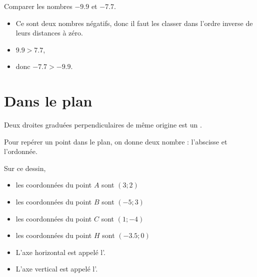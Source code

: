 \begin{example}
    Comparer les nombres \( -9.9\) et \( -7.7\).
    \begin{itemize}
        \item Ce sont deux nombres négatifs, donc il faut les classer dans l'ordre inverse de leurs distances à zéro.
        \item \( 9.9 > 7.7\),
        \item donc \( -7.7 > -9.9\).
    \end{itemize}
\end{example}

\section{Dans le plan}



\begin{definition}
    Deux droites graduées perpendiculaires de même origine est un . 
\end{definition}

\begin{Aretenir}
    Pour repérer un point dans le plan, on donne deux nombre : l'abscisse et l'ordonnée.
\end{Aretenir}

\begin{example}
    \begin{center}
        
    \end{center}
    Sur ce dessin,
    \begin{itemize}
        \item les coordonnées du point \( A\) sont \(  (3;2)  \)
        \item les coordonnées du point \( B\) sont \(  (-5;3)  \)
        \item les coordonnées du point \( C\) sont \(  (1;-4)  \)
        \item les coordonnées du point \( H\) sont \(  (-3.5;0)  \)
    \end{itemize}
\end{example}

\begin{definition}
    \begin{itemize}
        \item 
            L'axe horizontal est appelé l'.
        \item
            L'axe vertical est appelé l'.
    \end{itemize}
\end{definition}


